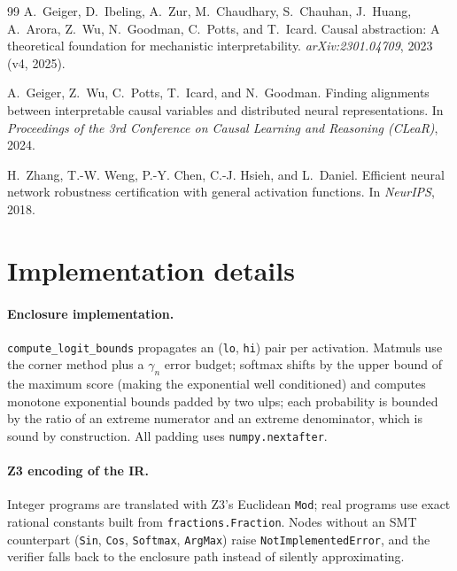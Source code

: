 \documentclass[11pt]{article}
\newcommand{\code}[1]{\texttt{#1}}
\begin{document}
\begin{thebibliography}{99}
A.~Geiger, D.~Ibeling, A.~Zur, M.~Chaudhary, S.~Chauhan, J.~Huang, A.~Arora,
  Z.~Wu, N.~Goodman, C.~Potts, and T.~Icard.
\newblock Causal abstraction: A theoretical foundation for mechanistic
  interpretability.
\newblock \emph{arXiv:2301.04709}, 2023 (v4, 2025).

A.~Geiger, Z.~Wu, C.~Potts, T.~Icard, and N.~Goodman.
\newblock Finding alignments between interpretable causal variables and
  distributed neural representations.
\newblock In \emph{Proceedings of the 3rd Conference on Causal Learning and
  Reasoning (CLeaR)}, 2024.

H.~Zhang, T.-W. Weng, P.-Y. Chen, C.-J. Hsieh, and L.~Daniel.
\newblock Efficient neural network robustness certification with general
  activation functions.
\newblock In \emph{NeurIPS}, 2018.

\end{thebibliography}

\appendix
\section{Implementation details}
\label{app:impl}

\paragraph{Enclosure implementation.}
\code{compute\_logit\_bounds} propagates an (\code{lo}, \code{hi}) pair per
activation. Matmuls use the corner method plus a $\gamma_n$ error budget;
softmax shifts by the upper bound of the maximum score (making the exponential
well conditioned) and computes monotone exponential bounds padded by two ulps;
each probability is bounded by the ratio of an extreme numerator and an extreme
denominator, which is sound by construction. All padding uses
\code{numpy.nextafter}.

\paragraph{Z3 encoding of the IR.}
Integer programs are translated with Z3's Euclidean \code{Mod}; real programs use
exact rational constants built from \code{fractions.Fraction}. Nodes without an
SMT counterpart (\code{Sin}, \code{Cos}, \code{Softmax}, \code{ArgMax}) raise
\code{NotImplementedError}, and the verifier falls back to the enclosure path
instead of silently approximating.
\end{document}
